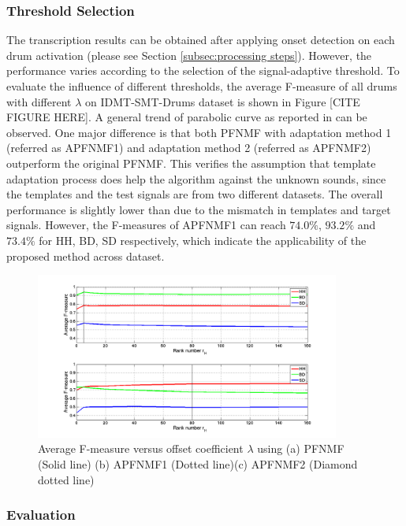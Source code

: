 \documentclass{article}
\begin{document}
\subsubsection{Threshold Selection}\label{subsec:threshold}
The transcription results can be obtained after applying onset detection on each drum activation (please see Section \ref{subsec:processing steps}). However, the performance varies according to the selection of the signal-adaptive threshold. To evaluate the influence of different thresholds, the average F-measure of all drums with different $\lambda$ on IDMT-SMT-Drums dataset is shown in Figure [CITE FIGURE HERE]. A general trend of parabolic curve as reported in \cite{Dittmar2014} can be observed. One major difference is that both PFNMF with adaptation method 1 (referred as APFNMF1) and adaptation method 2 (referred as APFNMF2) outperform the original PFNMF. This verifies the assumption that template adaptation process does help the algorithm against the unknown sounds, since the templates and the test signals are from two different datasets. The overall performance is slightly lower than \cite{Dittmar2014} due to the mismatch in templates and target signals. However, the F-measures of APFNMF1 can reach $74.0\%$, $93.2\%$ and $73.4\%$ for HH, BD, SD respectively, which indicate the applicability of the proposed method across dataset. 

\begin{figure}
 \centerline{
 \includegraphics[width=10cm]{testOnK_mono_poly.png}}
 \caption{Average F-measure versus offset coefficient $\lambda$ using (a) PFNMF (Solid line) (b) APFNMF1 (Dotted line)(c) APFNMF2 (Diamond dotted line)}%
 \label{fig:thresTest}
\end{figure}

\subsubsection{Evaluation}\label{subsec:Evaluation}
\end{document}
